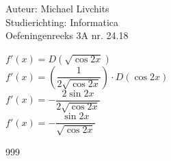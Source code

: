 \documentclass[a4paper]{article}
\begin{document}
  
\noindent \large Auteur: Michael Livchits \\
\noindent \large Studierichting: Informatica\\
\noindent \large Oefeningenreeks 3A nr. 24.18\\

\medskip

\normalsize

$f'(x) = D\left(\sqrt{\cos2x}\right)$\\

$f'(x) = \left(\dfrac{1}{2\sqrt{\cos2x}}\right)\cdot D(\cos2x)$\\

$f'(x) = -\dfrac{2\sin2x}{2\sqrt{\cos2x}}$\\

$f'(x) = -\dfrac{\sin2x}{\sqrt{\cos2x}}$\\

\begin{thebibliography}{999}
\end{thebibliography}
\end{document}
